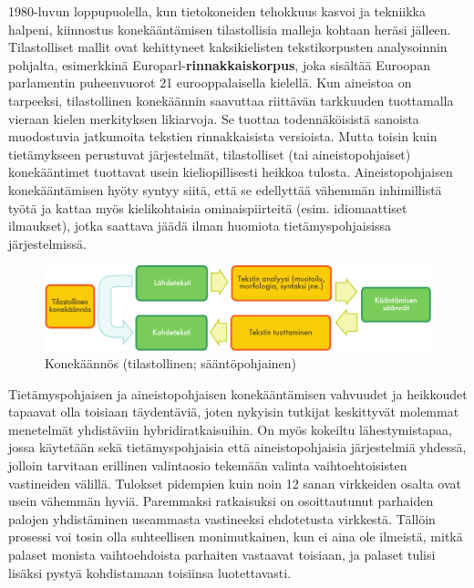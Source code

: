 \begin{multicols}{2}

1980-luvun loppupuolella, kun tietokoneiden tehokkuus kasvoi ja tekniikka halpeni, kiinnostus konekääntämisen tilastollisia malleja kohtaan heräsi jälleen. Tilastolliset mallit ovat kehittyneet kaksikielisten tekstikorpusten analysoinnin pohjalta, esimerkkinä Europarl-\textbf{rinnakkaiskorpus}, joka sisältää Euroopan parlamentin puheenvuorot 21 eurooppalaisella kielellä. Kun aineistoa on tarpeeksi, tilastollinen konekäännin saavuttaa riittävän tarkkuuden tuottamalla vieraan kielen merkityksen likiarvoja. Se tuottaa todennäköisistä sanoista muodostuvia jatkumoita tekstien rinnakkaisista versioista. Mutta toisin kuin tietämykseen perustuvat järjestelmät, tilastolliset (tai aineistopohjaiset) konekääntimet tuottavat usein kieliopillisesti heikkoa tulosta.  Aineistopohjaisen konekääntämisen hyöty syntyy siitä, että se edellyttää vähemmän inhimillistä työtä ja kattaa myös kielikohtaisia ominaispiirteitä (esim. idiomaattiset ilmaukset), jotka saattava jäädä ilman huomiota tietämyspohjaisissa järjestelmissä.

\begin{figure}[htb]
  \center
  \includegraphics[width=\textwidth]{../_media/finnish/machine_translation}
  \caption{Konekäännös (tilastollinen; sääntöpohjainen)}
  \label{fig:mtarch-fin}
\end{figure}

Tietämyspohjaisen ja aineistopohjaisen konekääntämisen vahvuudet ja heikkoudet tapaavat olla toisiaan täydentäviä, joten nykyisin tutkijat keskittyvät molemmat menetelmät yhdistäviin hybridiratkaisuihin.  On myös kokeiltu lähestymistapaa, jossa käytetään sekä tietämyspohjaisia että aineistopohjaisia järjestelmiä yhdessä, jolloin tarvitaan erillinen valintaosio tekemään valinta vaihtoehtoisisten vastineiden välillä.  Tulokset pidempien kuin noin 12 sanan virkkeiden osalta ovat usein vähemmän hyviä. Paremmaksi ratkaisuksi on osoittautunut parhaiden palojen yhdistäminen useammasta vastineeksi ehdotetusta virkkestä.  Tällöin prosessi voi tosin olla suhteellisen monimutkainen, kun ei aina ole ilmeistä, mitkä palaset monista vaihtoehdoista parhaiten vastaavat toisiaan, ja palaset tulisi lisäksi pystyä kohdistamaan toisiinsa luotettavasti.


\end{multicols}
